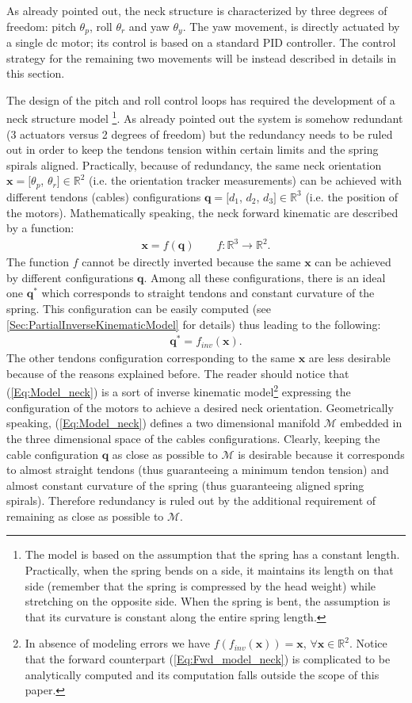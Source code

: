 \documentclass[conference]{IEEEtran}
\numberwithin{equation}{section}
\newcommand{\q}{\mathbf{q}}
\newcommand{\x}{\mathbf{x}}
\begin{document}
As already pointed out, the neck structure is characterized by three degrees of freedom: pitch $\theta_p$, roll $\theta_r$ and yaw $\theta_y$. The yaw movement, is directly actuated by a single dc motor; its control is based on a standard PID controller. The control strategy for the remaining two movements will be instead described in details in this section.

The design of the pitch and roll control loops has required the development of a neck structure model \footnote{The model is based on the assumption that the spring has a constant length. Practically, when the spring bends on a side, it maintains its length on that side (remember that the spring is compressed by the head weight) while stretching on the opposite side. When the spring is bent, the assumption is that its curvature is constant along the entire spring length.}.
As already pointed out the system is somehow redundant (3 actuators versus 2 degrees of freedom) but the redundancy needs to be ruled out in order to keep the tendons tension within certain limits and the spring spirals aligned. Practically, because of redundancy, the same neck orientation $\x = [\theta_p$, $\theta_r] \in \mathbb R^2$ (i.e. the orientation tracker measurements) can be achieved with different tendons (cables) configurations $\q = [d_1$, $d_2$, $d_3] \in \mathbb R^3$ (i.e. the position of the motors). Mathematically speaking, the neck forward kinematic are described by a function:
\begin{eqnarray} \label{Eq:Fwd_model_neck}
\x = f (\q) \qquad f:\mathbb{R}^3 \rightarrow \mathbb{R}^2.
\end{eqnarray}
The function $f$ cannot be directly inverted because the same $\x$ can be achieved by different configurations $\q$. Among all these configurations, there is an ideal one $\q^*$ which corresponds to straight tendons and constant curvature of the spring. This configuration can be easily computed (see \ref{Sec:PartialInverseKinematicModel} for details) thus leading to the following:
\begin{eqnarray} \label{Eq:Model_neck}
\q^* = f_{inv} (\x).
\end{eqnarray}
The other tendons configuration corresponding to the same $\x$ are less desirable because of the reasons explained before. The reader should notice that (\ref{Eq:Model_neck}) is a sort of inverse kinematic model\footnote{In absence of modeling errors we have $f(f_{inv}(\x)) = \x$, $\forall \x \in \mathbb R^2$. Notice that the forward counterpart (\ref{Eq:Fwd_model_neck}) is  complicated to be analytically computed and its computation falls outside the scope of this paper.} expressing the configuration of the motors to achieve a desired neck orientation. Geometrically speaking, (\ref{Eq:Model_neck}) defines a two dimensional manifold $\mathcal M$ embedded in the three dimensional space of the cables configurations.
Clearly, keeping the cable configuration $\q$ as close as possible to $\mathcal M$ is desirable because it corresponds to almost straight tendons (thus guaranteeing a minimum tendon tension) and almost constant curvature of the spring (thus guaranteeing aligned spring spirals). Therefore redundancy is ruled out by the additional requirement of remaining as close as possible to $\mathcal M$.
\end{document}
